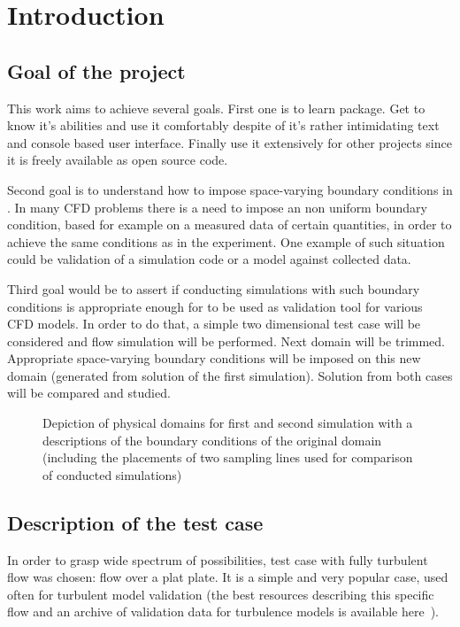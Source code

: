 \chapter{Introduction}
    \section{Goal of the project}
        This work aims to achieve several goals. First one is to learn \oFoam package. 
        Get to know it's abilities and use it comfortably despite of it's rather intimidating text and console based user interface.
        Finally use it extensively for other projects since it is freely available as open source code.

        Second goal is to understand how to impose space-varying boundary conditions in \oFoam.
        In many CFD problems there is a need to impose an non uniform boundary condition, based for example on a measured data of certain quantities, in order to achieve the same conditions as in the experiment.
        One example of such situation could be validation of a simulation code or a model against collected data.
        
        
        Third goal would be to assert if conducting simulations with such boundary conditions is appropriate enough for \oFoam to be used as validation tool for various CFD models.
        In order to do that, a simple two dimensional test case will be considered and flow simulation will be performed.
        Next domain will be trimmed. Appropriate space-varying boundary conditions will be imposed on this new domain (generated from solution of the first simulation). Solution from both cases will be compared and studied.
        \begin{figure}[h]
            \centering
            
            \caption{Depiction of physical domains for first and second simulation with a descriptions of the boundary conditions of the original domain (including the placements of two sampling lines used for comparison of conducted simulations)}
            \label{fig::flatplate}
        \end{figure}

    \section{Description of the test case}
        In order to grasp wide spectrum of \oFoam possibilities, test case with fully turbulent flow was chosen: flow over a plat plate.
        It is a simple and very popular case, used often for turbulent model validation (the best resources describing this specific flow and an archive of validation data for turbulence models is available here~\cite{Nasa}).

